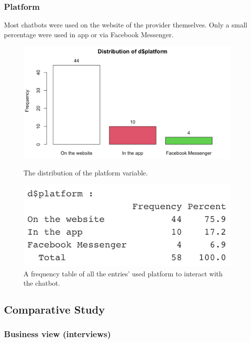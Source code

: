 \subsubsection{Platform}
Most chatbots were used on the website of the provider themselves. Only a small percentage were used in app or via Facebook Messenger.
\begin{figure}[!htb]
	\includegraphics[width=\linewidth]{../LaTeX/Figures/Environments/PlatformPlot.png}
	\caption{The distribution of the platform variable.}\label{fig:platformPlot}
	\endminipage\hfill
	\includegraphics[width=\linewidth]{../LaTeX/Figures/Environments/PlatformFreq.png}
	\caption{A frequency table of all the entries' used platform to interact with the chatbot.}\label{fig:platformFreq}
	\endminipage\hfill
\end{figure}

\subsection{Comparative Study}
\subsubsection{Business view (interviews)}

